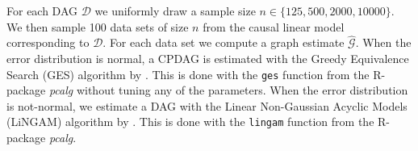 \documentclass[11pt,a4paper]{article}
\theoremstyle{definition}
\theoremstyle{remark}
\DeclareMathOperator{\pa}{pa}
\newcommand{\g}[1][G]{\mathcal{#1}}
\begin{document}
  For each DAG $\g[D]$ we uniformly draw a sample size $n \in \{125,500,2000,10000\}$. We then sample 100 data sets of size $n$ from the causal linear model corresponding to $\g[D]$. For each data set we compute a graph estimate $\widehat{\g}$. 
When the error distribution is normal, a CPDAG is estimated with the Greedy Equivalence Search (GES) algorithm by \citet{Chickering02}. This is done with the {\tt ges} function from the R-package {\em pcalg} without tuning any of the parameters. When the error distribution is not-normal, we estimate a DAG with the Linear Non-Gaussian Acyclic Models (LiNGAM) algorithm by \citet{shimizu2006linear}. This is done with the {\tt lingam}  function from the R-package {\em pcalg}. 
%
%
%
%
%
%
%
%
%
%
%
\end{document}
